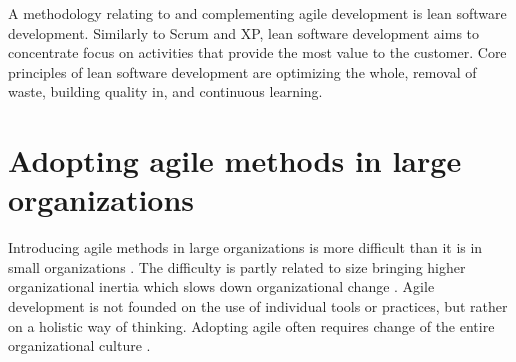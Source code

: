 A methodology relating to and complementing agile development is lean software
development. Similarly to Scrum and XP, lean software development aims to
concentrate focus on activities that provide the most value to the customer.
Core principles of lean software development are optimizing the whole, removal
of waste, building quality in, and continuous learning. \citep{Poppendieck2012}




% 
% 
% 


\section{Adopting agile methods in large organizations}

Introducing agile methods in large organizations is more difficult than it is in
small organizations \citep{Dyba2008}. The difficulty is partly related to size
bringing higher organizational inertia which slows down organizational change
\citep{Livermore2008}. Agile development is not founded on the use of individual
tools or practices, but rather on a holistic way of thinking. Adopting agile
often requires change of the entire organizational culture \citep{Misra2010}.

